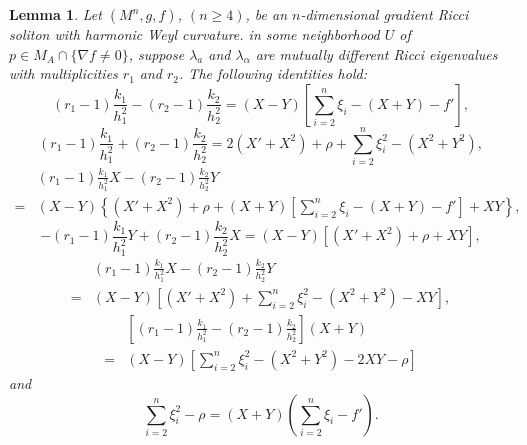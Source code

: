 \documentclass{amsart}
\newtheorem{lemma}[theorem]{Lemma}
\theoremstyle{definition}
\theoremstyle{remark}
\numberwithin{equation}{section}
\begin{document}
\begin{lemma}\label{lemma4.1}	
	Let $(M^n, g, f)$, $(n\geq 4)$, be an $n$-dimensional gradient Ricci soliton with harmonic Weyl curvature.
in some neighborhood $U$ of $p\in M_A \cap \{ \nabla f \neq 0  \}$, 
suppose $\lambda_a$ and $\lambda_\alpha$ are mutually different Ricci eigenvalues with multiplicities $r_1$ and $r_2$.
The following identities hold:
\begin{equation}\label{4.6}
(r_1-1)\frac{k_1}{h^2_1}-(r_2-1)\frac{k_2}{h^2_2}=(X-Y)\left[ \sum^n_{i=2}\xi_i-(X+Y)-f' \right],
\end{equation}
\begin{equation}\label{4.7}
 (r_1-1)\frac{k_1}{h^2_1}+ (r_2-1)\frac{k_2}{h^2_2}
 =2(X'+X^2 ) +\rho+\sum^n_{i=2}\xi^2_i-(X^2+Y^2),
\end{equation}
\begin{equation}\label{4.8}
\begin{aligned}
&(r_1-1)\frac{k_1}{h^2_1}X- (r_2-1)\frac{k_2}{h^2_2}Y\\
=&(X-Y)\left\{ (X'+X^2 ) +\rho+(X+Y)\left[ \sum^n_{i=2}\xi_i-(X+Y) -f'\right]+XY\right\},
\end{aligned}
\end{equation}
\begin{equation}\label{4.9}
-(r_1-1)\frac{k_1}{h^2_1}Y+(r_2-1)\frac{k_2}{h^2_2}X
=(X-Y)[(X'+X^2 )+\rho+XY],
\end{equation}
\begin{equation}\label{4.10}
\begin{aligned}
&(r_1-1)\frac{k_1}{h^2_1}X- (r_2-1)\frac{k_2}{h^2_2}Y\\
=&(X-Y)\left[(X'+X^2 )+\sum^n_{i=2}\xi^2_i-(X^2+Y^2)-XY\right],
\end{aligned}
\end{equation}
\begin{equation}\label{4.11}
\begin{aligned}
&\left[(r_1-1)\frac{k_1}{h^2_1}- (r_2-1)\frac{k_2}{h^2_2} \right](X+Y)\\
=&(X-Y)\left[\sum^n_{i=2}\xi^2_i-(X^2+Y^2)-2XY-\rho \right]
\end{aligned}
\end{equation}	
and 
 \begin{equation}\label{4.12}
 \sum^n_{i=2}\xi^2_i-\rho=(X+Y)\left( \sum^n_{i=2}\xi_i -f' \right).
 \end{equation}
\end{lemma}
\end{document}
